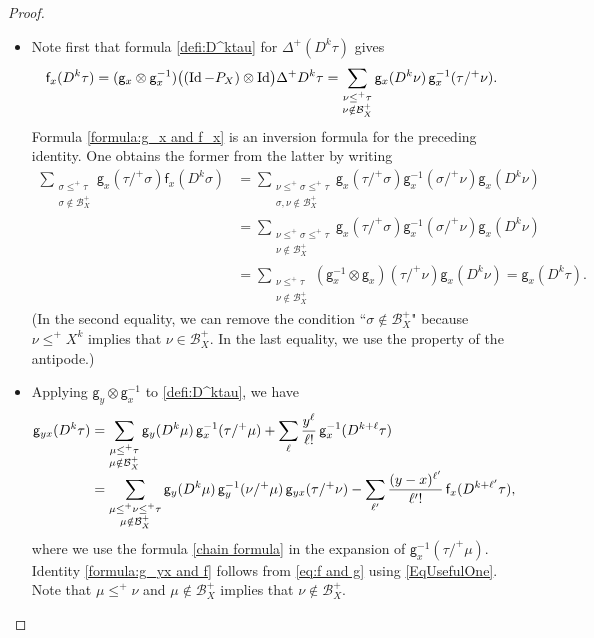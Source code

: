 \documentclass[11pt]{article}
\numberwithin{equation}{section}
\theoremstyle{plain}
\theoremstyle{definition}
\DeclareMathOperator{\iden}{Id}
\newcommand{\sff}{\mathsf{f}}
\newcommand{\sfg}{\mathsf{g}}
\newcommand{\mcB}{\mathcal{B}}
\begin{document}
\begin{proof}
\begin{itemize}
\item
Note first that formula \eqref{defi:D^ktau} for $\Delta^+(D^k\tau)$ gives
\begin{equation} \label{EqUsefulOne}
{\sff}_x(D^k\tau) = ({\sf g}_x\otimes {\sf g}_x^{-1})\bigl((\iden-P_X)\otimes\iden\bigr)\Delta^+D^k\tau = \sum_{\substack{\nu\leq^+\tau\\ \nu\notin\mcB_X^+}} {\sfg}_x(D^k\nu)\,{\sfg}_x^{-1}(\tau/^+\nu).
\end{equation}
Formula \eqref{formula:g_x and f_x} is an inversion formula for the preceding identity. One obtains the former from the latter by writing
\begin{align*}
\sum_{\substack{\sigma\leq^+\tau\\\sigma\notin\mcB_X^+}}\sfg_x(\tau/^+\sigma)\sff_x(D^k\sigma) &= \sum_{\substack{\nu\le^+\sigma\le^+\tau\\\sigma,\nu\notin\mcB_X^+}} \sfg_x(\tau/^+\sigma)\sfg_x^{-1}(\sigma/^+\nu)\sfg_x(D^k\nu) \\
&= \sum_{\substack{\nu\le^+\sigma\le^+\tau\\\nu\notin\mcB_X^+}} \sfg_x(\tau/^+\sigma)\sfg_x^{-1}(\sigma/^+\nu)\sfg_x(D^k\nu) \\
&= \sum_{\substack{\nu\le^+\tau\\\nu\notin\mcB_X^+}}(\sfg_x^{-1}\otimes\sfg_x)(\tau/^+\nu)\sfg_x(D^k\nu)= \sfg_x(D^k\tau).
\end{align*}
(In the second equality, we can remove the condition ``$\sigma\notin\mcB_X^+$" because $\nu\le^+X^k$ implies that $\nu\in\mcB_X^+$. In the last equality, we use the property of the antipode.)

\item
Applying $\sfg_y\otimes\sfg_x^{-1}$ to \eqref{defi:D^ktau}, we have
\begin{align}\label{eq:f and g}
\sfg_{yx}(D^k\tau)
&= \sum_{\substack{\mu\le^+\tau\\\mu\notin\mcB_X^+}} \sfg_y(D^k\mu)\,\sfg_x^{-1}(\tau/^+\mu) + \sum_\ell\frac{y^\ell}{\ell!}\,\sfg_x^{-1}(D^{k+\ell}\tau)\notag \\[-15pt] \\[-5pt]
&= \sum_{\substack{\mu\le^+\nu\le^+\tau\\\mu\notin\mcB_X^+}} \sfg_y(D^k\mu)\,\sfg_y^{-1}(\nu/^+\mu)\,\sfg_{yx}(\tau/^+\nu) - \sum_{\ell'}\frac{(y-x)^{\ell'}}{\ell'!}\,\sff_x(D^{k+\ell'}\tau),\notag
\end{align}
where we use the formula \eqref{chain formula} in the expansion of $\sfg_x^{-1}(\tau/^+\mu)$. Identity \eqref{formula:g_yx and f} follows from \eqref{eq:f and g} using \eqref{EqUsefulOne}. Note that $\mu\le^+\nu$ and $\mu\notin\mcB_X^+$ implies that $\nu\notin\mcB_X^+$.


\end{itemize}
\end{proof}
\end{document}
